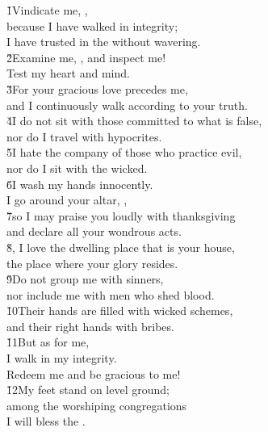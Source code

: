 \begin{poetry}
\poeml \v{1}Vindicate me, , \\
\poemll    because I have walked in integrity; \\
\poemlll       I have trusted in the  without wavering. \\
\poeml \v{2}Examine me, , and inspect me! \\
\poemll    Test my heart and mind. \\
\poeml \v{3}For your gracious love precedes me, \\
\poemll    and I continuously walk according to your truth. \\
\poeml \v{4}I do not sit with those committed to what is false, \\
\poemll    nor do I travel with hypocrites. \\
\poeml \v{5}I hate the company of those who practice evil, \\
\poemll    nor do I sit with the wicked. \\
\poeml \v{6}I wash my hands innocently. \\
\poemll    I go around your altar, , \\
\poeml \v{7}so I may praise you loudly with thanksgiving \\
\poemll    and declare all your wondrous acts. \\
\poeml \v{8}, I love the dwelling place that is your house, \\
\poemll    the place where your glory resides. \\
\poeml \v{9}Do not group me with sinners, \\
\poemll    nor include me with men who shed blood. \\
\poeml \v{10}Their hands are filled with wicked schemes, \\
\poemll    and their right hands with bribes. \\
\poeml \v{11}But as for me, \\
\poemll    I walk in my integrity. \\
\poemlll       Redeem me and be gracious to me! \\
\poeml \v{12}My feet stand on level ground; \\
\poemll    among the worshiping congregations \\
\poemlll       I will bless the .
\end{poetry}

